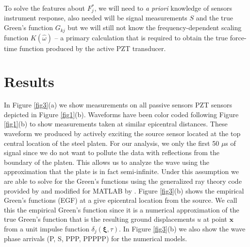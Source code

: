 \documentclass[preprint,3p, 11pt,authoryear]{elsarticle}
\begin{document}
\noindent To solve the features about $F^{*}_{j}$, we will need to \textit{a priori} knowledge of sensors instrument response, also needed will be signal measurements $S$ and the true Green's function $G_{kj}$ but we will still not know the frequency-dependent scaling function $K(\hat{\omega})$ -- a primary calculation that is required to obtain the true force-time function produced by the active PZT transducer.

\section{Results}
\label{results}

In Figure \ref{fig3}(a) we show measurements on all passive sensors PZT sensors depicted in Figure \ref{fig1}(b).  Waveforms have been color coded following Figure \ref{fig1}(b) to show measurements taken at similar epicentral distances. These waveform we produced by actively exciting the source sensor located at the top central location of the steel platen. For our analysis, we only the first 50 $\mu$s of signal since we do not want to pollute the data with reflections from the boundary of the platen.  This allows us to analyze the wave using the approximation that the plate is in fact semi-infinite. Under this assumption we are able to solve for the Green's functions using the generalized ray theory code provided by \citet{Hsu1985} and modified for MATLAB by \citet{McLaskey2012}.  Figure \ref{fig3}(b) shows the empirical Green's functions (EGF) at a give epicentral location from the source. We call this the empirical Green's function since it is a numerical approximation of the true Green's function that is the resulting ground displacements $u$ at point $\mathbf{x}$ from a unit impulse function $\delta_{j}(\mathbf{\xi}, \tau)$. In Figure \ref{fig3}(b) we also show the wave phase arrivals (P, S, PPP, PPPPP) for the numerical models.
\end{document}

